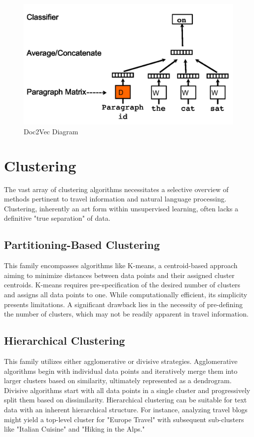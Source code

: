 \documentclass[12pt,a4paper]{report}
\begin{document}
\begin{figure}[H]
    \centering
    \includegraphics[scale=.6]{doc2vec}
    \caption{Doc2Vec Diagram\citep{le2014distributed}}
\end{figure}

\section{Clustering}

The vast array of clustering algorithms necessitates a selective overview of methods pertinent to travel information and natural language processing. Clustering, inherently an art form within unsupervised learning, often lacks a definitive "true separation" of data.

\subsection{Partitioning-Based Clustering} This family encompasses algorithms like K-means, a centroid-based approach aiming to minimize distances between data points and their assigned cluster centroids\citep{allahyari2017brief}. K-means requires pre-specification of the desired number of clusters and assigns all data points to one. While computationally efficient, its simplicity presents limitations. A significant drawback lies in the necessity of pre-defining the number of clusters, which may not be readily apparent in travel information.

\subsection{Hierarchical Clustering} This family utilizes either agglomerative or divisive strategies. Agglomerative algorithms begin with individual data points and iteratively merge them into larger clusters based on similarity, ultimately represented as a dendrogram\citep{allahyari2017brief}. Divisive algorithms start with all data points in a single cluster and progressively split them based on dissimilarity. Hierarchical clustering can be suitable for text data with an inherent hierarchical structure. For instance, analyzing travel blogs might yield a top-level cluster for "Europe Travel" with subsequent sub-clusters like "Italian Cuisine" and "Hiking in the Alps."
\end{document}
